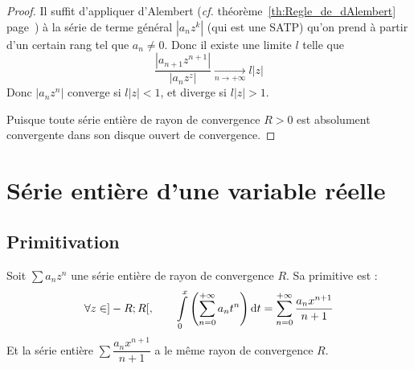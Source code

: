 \documentclass[11pt,a4paper,fleqn,pdftex]{report}
\begin{document}
\begin{proof}
Il suffit d'appliquer d'Alembert (\textit{cf.} théorème~\ref{th:Regle_de_dAlembert} page~\pageref{th:Regle_de_dAlembert}) à la série de terme général $|a_n z^k|$ (qui est une \gls{SATP}) qu'on prend à partir d'un certain rang tel que $a_n \neq 0$. Donc il existe une limite $l$ telle que \[\dfrac{|a_{n+1}z^{n+1}|}{|a_nz^z|}\xrightarrow[n\to +\infty]{} l|z|\]
Donc $|a_nz^n|$ converge si $l|z| < 1$, et diverge si $l|z| > 1$.
\par
Puisque toute série entière de rayon de convergence $R>0$ est absolument convergente dans son disque ouvert de convergence.
\end{proof}
\section{Série entière d'une variable réelle} %
\label{sec:serie_entiere_d_une_variable_reelle}
\subsection{Primitivation} %
\label{sub:primitivation_DSE}
\begin{theorem}
     Soit $\sum a_n z^n$ une série entière de rayon de convergence $R$. Sa primitive est :
        \begin{equation}
        \forall z\in ]-R;R[,\qquad \int \limits_0^x \left( \sum_{n=0}^{+\infty} a_n t^n \right)\mathrm{d} t = \sum_{n=0}^{+\infty} \dfrac{a_n x^{n+1}}{n+1} 
        \end{equation}
        Et la série entière $\sum \dfrac{a_n x^{n+1}}{n+1} $ a le même rayon de convergence $R$.
        \end{theorem}
\end{document}
